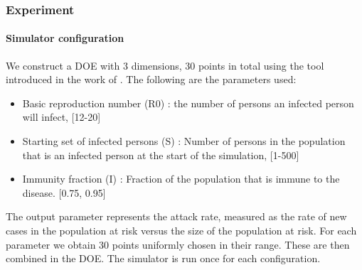 \subsubsection{Experiment}
\paragraph{Simulator configuration}
We construct a DOE with 3 dimensions, 30 points in total using the tool introduced in the work of \citep{DOE}. 
The following are the parameters used:
\begin{itemize}
\item Basic reproduction number (R0) : the number of persons an infected person will infect, [12-20]
\item Starting set of infected persons (S) : Number of persons in the population that is an infected person at the start of the simulation, [1-500]
\item Immunity fraction (I) : Fraction of the population that is immune to the disease. [0.75, 0.95]
\end{itemize}
The output parameter represents the attack rate, measured as the rate of new cases in the population at risk versus the size of the population at risk.
For each parameter we obtain 30 points uniformly chosen in their range. These are then combined in the DOE.
The simulator is run once for each configuration. 
